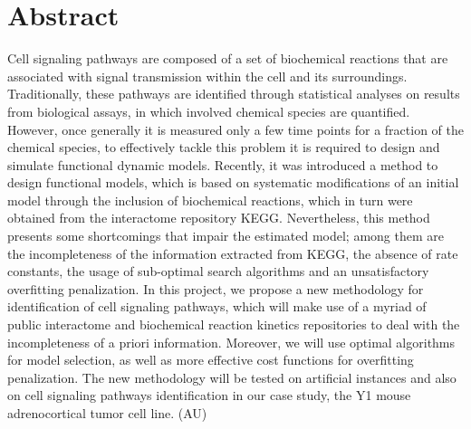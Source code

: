 \documentclass[12pt, twoside]{report}
\numberwithin{mydefinition}{section}
\numberwithin{mytheorem}{section}
\numberwithin{mylemma}{section}
\numberwithin{corollary}{section}
\begin{document}
\chapter*{Abstract}
Cell signaling pathways are composed of a set of biochemical reactions 
that are associated with signal transmission within the cell and its 
surroundings. Traditionally, these pathways are identified through 
statistical analyses on results from biological assays, in which 
involved chemical species are quantified. However, once generally it is 
measured only a few time points for a fraction of the chemical species, 
to effectively tackle this problem it is required to design and simulate 
functional dynamic models. Recently, it was introduced a method to 
design functional models, which is based on systematic modifications of 
an initial model through the inclusion of biochemical reactions, which 
in turn were obtained from the interactome repository KEGG. 
Nevertheless, this method presents some shortcomings that impair the 
estimated model; among them are the incompleteness of the information 
extracted from KEGG, the absence of rate constants, the usage of 
sub-optimal search algorithms and an unsatisfactory overfitting 
penalization. In this project, we propose a new methodology for 
identification of cell signaling pathways, which will make use of a 
myriad of public interactome and biochemical reaction kinetics 
repositories to deal with the incompleteness of a priori information. 
Moreover, we will use optimal algorithms for model selection, as well as 
more effective cost functions for overfitting penalization. The new 
methodology will be tested on artificial instances and also on cell 
signaling pathways identification in our case study, the Y1 mouse 
adrenocortical tumor cell line. (AU)
\end{document}
